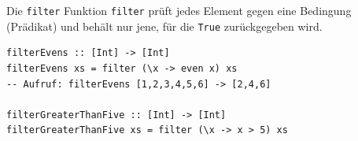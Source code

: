 \documentclass[aspectratio=169,11pt]{beamer}
\begin{document}
\begin{frame}[fragile]{Die \texttt{filter} Funktion}
    \texttt{filter} prüft jedes Element gegen eine Bedingung (Prädikat) und behält nur jene, für die \texttt{True} zurückgegeben wird.
    
    \begin{tcolorbox}[modernbox, title=Beispiel: Filter]
\begin{lstlisting}
filterEvens :: [Int] -> [Int]
filterEvens xs = filter (\x -> even x) xs
-- Aufruf: filterEvens [1,2,3,4,5,6] -> [2,4,6]

filterGreaterThanFive :: [Int] -> [Int]
filterGreaterThanFive xs = filter (\x -> x > 5) xs
\end{lstlisting}
    \end{tcolorbox}
\end{frame}
\end{document}
